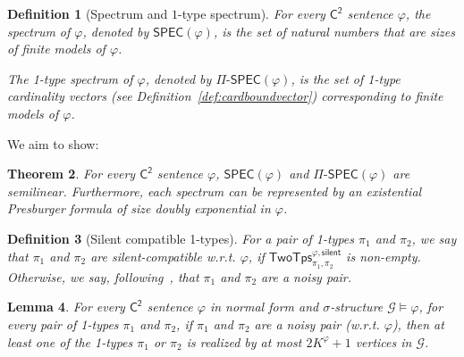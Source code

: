 \documentclass[10pt,a4paper]{article}
\newtheorem{theorem}{Theorem}
\newtheorem{lemma}[theorem]{Lemma}
\newtheorem{definition}[theorem]{Definition}
\theoremstyle{definition}
\theoremstyle{remark}
\newcommand{\cG}{\mathcal{G}}
\newcommand{\cK}{\mathsf{TwoTps}}
\newcommand{\vocab}{\sigma}
\newcommand{\Ctwo}    {\mathsf{C^2}}
\newcommand{\cKvpnull}  {\cK^{\varphi, \mathsf{silent}}}
\newcommand{\spec} {\mathsf{SPEC}}
\newcommand{\pispec} {\Pi\text{-}\mathsf{SPEC}}
\begin{document}
\begin{definition}[Spectrum and $1$-type spectrum]
    For every $\Ctwo$ sentence $\varphi$,
    the spectrum of $\varphi$, denoted by $\spec(\varphi)$,
    is the set of natural numbers that are sizes of finite models of $\varphi$.

    The 1-type spectrum of $\varphi$, denoted by $\pispec(\varphi)$,
    is the set of 1-type cardinality vectors (see Definition~\ref{def:cardboundvector}) corresponding to finite models of $\varphi$.
\end{definition}

We aim to show: 


\begin{theorem} \label{thm:spectrasemilinear}
    For every $\Ctwo$ sentence $\varphi$,
    $\spec(\varphi)$ and $\pispec(\varphi)$ are semilinear.
    Furthermore, each spectrum can be represented by an existential Presburger formula of size doubly exponential in $\varphi$.
\end{theorem}


\begin{definition}[Silent compatible 1-types]
    For a pair of 1-types $\pi_1$ and $\pi_2$,
    we say that $\pi_1$ and $\pi_2$ are \emph{silent-compatible} w.r.t. $\varphi$,
    if $\cKvpnull_{\pi_1, \pi_2}$ is non-empty. Otherwise, we say, following~\cite{ctwocomplexity}, that 
    $\pi_1$ and $\pi_2$ are a \emph{noisy pair}.
\end{definition}

\begin{lemma} \label{lem:differentiated}
    For every $\Ctwo$ sentence $\varphi$ in normal form and $\vocab$-structure $\cG \models \varphi$,
    for every pair of 1-types $\pi_1$ and $\pi_2$,
    if $\pi_1$ and $\pi_2$ are a noisy pair (w.r.t. $\varphi$), then
    at least one of the 1-types $\pi_1$ or $\pi_2$ is realized by at most $2K^\varphi+1$ vertices in $\cG$.
\end{lemma}
\end{document}
